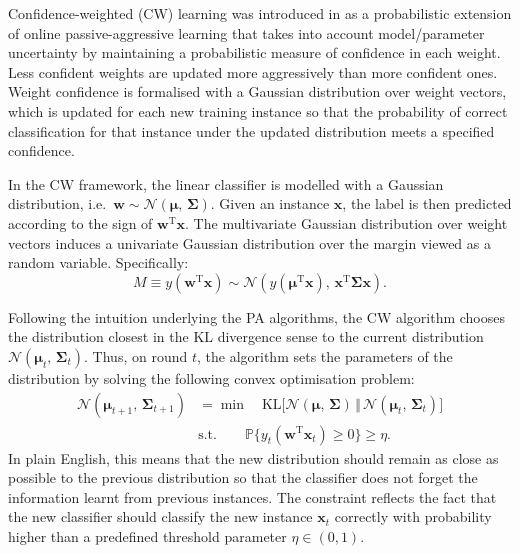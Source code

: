 Confidence-weighted (CW) learning was introduced in \citep{dredze08} as a probabilistic extension of online passive-aggressive learning that takes into account model/parameter uncertainty by maintaining a probabilistic measure of confidence in each weight. Less confident weights are updated more aggressively than more confident ones. Weight confidence is formalised with a Gaussian distribution over weight vectors, which is updated for each new training instance so that the probability of correct classification for that instance under the updated distribution meets a specified confidence.

In the CW framework, the linear classifier is modelled with a Gaussian distribution, i.e.\ $\mathbf{w} \sim \mathcal{N}(\boldsymbol{\mu},\, \boldsymbol{\Sigma})$. Given an instance $\mathbf{x}$, the label is then predicted according to the sign of $\mathbf{w}^\text{T}\mathbf{x}$. The multivariate Gaussian distribution over weight vectors induces a univariate Gaussian distribution over the margin viewed as a random variable. Specifically:
\begin{equation}
	M \equiv y(\mathbf{w}^\text{T}\mathbf{x}) \sim \mathcal{N}(y(\boldsymbol{\mu}^\text{T}\mathbf{x}),\, \mathbf{x}^\text{T}\boldsymbol{\Sigma}\mathbf{x}).
\end{equation}


Following the intuition underlying the PA algorithms, the CW algorithm chooses the distribution closest in the KL divergence sense to the current distribution $\mathcal{N}(\boldsymbol{\mu}_t,\, \boldsymbol{\Sigma}_t)$. Thus, on round $t$, the algorithm sets the parameters of the distribution by solving the following convex optimisation problem:
\begin{align}
	\mathcal{N}(\boldsymbol{\mu}_{t+1},\, \boldsymbol{\Sigma}_{t+1})
	&= \min \quad \mathrm{KL}\big[\mathcal{N}(\boldsymbol{\mu},\, \boldsymbol{\Sigma}) \, \Vert \, \mathcal{N}(\boldsymbol{\mu}_t,\, \boldsymbol{\Sigma}_t)\big]
	\\ \nonumber
	& \text{s.t.} \qquad \mathbb{P}\Big\{y_{t}(\mathbf{w}^\text{T}\mathbf{x}_{t}) \geq 0\Big\} \geq \eta.
\end{align}
In plain English, this means that the new distribution should remain as close as possible to the previous distribution so that the classifier does not forget the information learnt from previous instances. The constraint reflects the fact that the new classifier should classify the new instance $\mathbf{x}_t$ correctly with probability higher than a predefined threshold parameter $\eta \in (0, 1)$.

